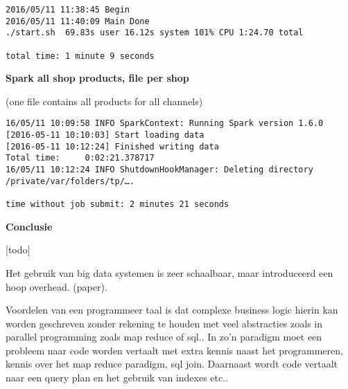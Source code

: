 \begin{lstlisting}
2016/05/11 11:38:45 Begin
2016/05/11 11:40:09 Main Done
./start.sh  69.83s user 16.12s system 101% CPU 1:24.70 total

total time: 1 minute 9 seconds
\end{lstlisting}

\textbf{Spark all shop products, file per shop}

(one file contains all products for all channels)

\begin{lstlisting}
16/05/11 10:09:58 INFO SparkContext: Running Spark version 1.6.0
[2016-05-11 10:10:03] Start loading data
[2016-05-11 10:12:24] Finished writing data
Total time:     0:02:21.378717
16/05/11 10:12:24 INFO ShutdownHookManager: Deleting directory /private/var/folders/tp/….

time without job submit: 2 minutes 21 seconds
\end{lstlisting}


\textbf{Conclusie}

[todo]

Het gebruik van big data systemen is zeer schaalbaar, maar introduceerd een hoop overhead. (paper).

Voordelen van een programmeer taal is dat complexe business logic hierin kan worden geschreven zonder rekening te houden met veel abstracties zoals in parallel programming zoals map reduce of sql.. In zo'n paradigm moet een probleem naar code worden vertaalt met extra kennis naast het programmeren, kennis over het map reduce paradigm, sql join. Daarnaast wordt code vertaalt naar een query plan en het gebruik van indexes etc..

